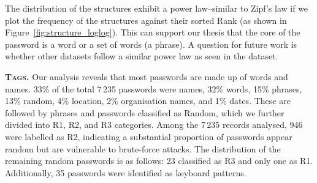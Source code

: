 The distribution of the structures exhibit a power law--similar to Zipf's law if we plot the frequency of the structures against their sorted Rank (as shown in Figure~\ref{fig:structure_loglog}). This can support our thesis that the core of the password is a word or a set of words (a phrase). A question for future work is whether other datasets follow a similar power law as seen in the \hmail dataset.




\textbf{\textsc{Tags.}}\: Our analysis reveals that most passwords are made up of words and names. 33\% of the total 7\,235 passwords were names, 32\% words, 15\% phrases, 13\% random, 4\% location, 2\% organisation names, and 1\% dates. These are followed by phrases and passwords classified as Random, which we further divided into R1, R2, and R3 categories. Among the 7\,235 records analysed, 946 were labelled as R2, indicating a substantial proportion of passwords appear random but are vulnerable to brute-force attacks. The distribution of the remaining random passwords is as follows: 23 classified as R3 and only one as R1. Additionally, 35 passwords were identified as keyboard patterns.


